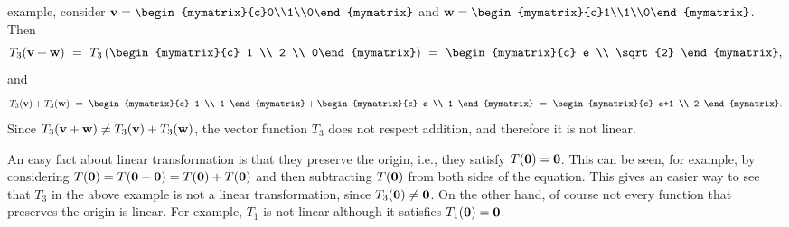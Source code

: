 \begin{solution}
\begin{enumerate}
    example, consider
    $\vect{v}=\begin{mymatrix}{c}0\\1\\0\end{mymatrix}$ and
    $\vect{w}=\begin{mymatrix}{c}1\\1\\0\end{mymatrix}$.
    Then
    \begin{equation*}
      T_3(\vect{v}+\vect{w})
      ~=~ T_3\tup{\begin{mymatrix}{c} 1 \\ 2 \\ 0\end{mymatrix}}
      ~=~ \begin{mymatrix}{c} e \\ \sqrt{2} \end{mymatrix},
    \end{equation*}
    and
    \begin{equation*}
      T_3(\vect{v})+T_3(\vect{w})
      ~=~ \begin{mymatrix}{c} 1 \\ 1 \end{mymatrix}
      + \begin{mymatrix}{c} e \\ 1 \end{mymatrix}
      ~=~ \begin{mymatrix}{c} e+1 \\ 2 \end{mymatrix}.
    \end{equation*}
    Since $T_3(\mbox{\bf v}+\mbox{\bf w})\neq T_3(\mbox{\bf v})+T_3(\mbox{\bf w})$,
    the vector function $T_3$ does not respect addition, and therefore
    it is not linear.
  \end{enumerate}
\end{solution}

An easy fact about linear transformation is that they preserve the
origin, i.e., they satisfy $T(\mbox{\bf 0}) = \mbox{\bf 0}$. This can be seen,
for example, by considering
$T(\mbox{\bf 0}) = T(\mbox{\bf 0}+\mbox{\bf 0}) = T(\mbox{\bf 0}) + T(\mbox{\bf 0})$ and
then subtracting $T(\mbox{\bf 0})$ from both sides of the equation.  This
gives an easier way to see that $T_3$ in the above example is not a
linear transformation, since $T_3(\mbox{\bf 0}) \neq \mbox{\bf 0}$. On the
other hand, of course not every function that preserves the origin is
linear. For example, $T_1$ is not linear although it satisfies
$T_1(\mbox{\bf 0})=\mbox{\bf 0}$.

